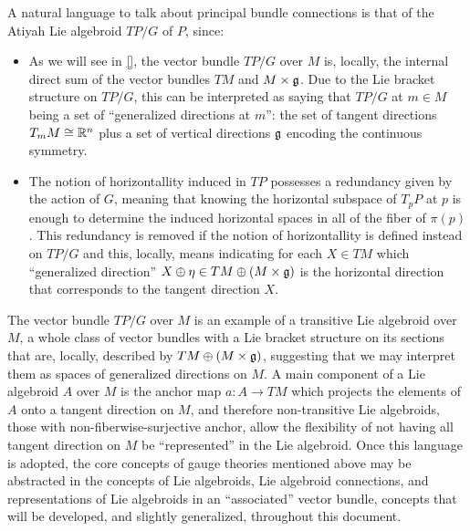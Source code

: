 A natural language to talk about principal bundle connections is that of the Atiyah Lie algebroid $TP/G$ of $P$, since:
    \begin{itemize}

    
    \item As we will see in \ref{}, the vector bundle $TP/G$ over $M$ is, locally, the internal direct sum of the vector bundles $TM$ and $M\times \mathfrak{g}$. Due to the Lie bracket structure on $TP/G$, this can be interpreted as saying that $TP/G$ at $m \in M$ being a set of ``generalized directions at $m$'': the set of tangent directions $T_m M \cong \mathbb{R}^n$ plus a set of vertical directions $\mathfrak{g}$ encoding the continuous symmetry.
    
    \item The notion of horizontallity induced in $TP$  %
    possesses a redundancy given by the action of $G$, meaning that knowing the horizontal subspace of $T_p P$ at $p$ is enough to determine the induced horizontal spaces in all of the fiber of $\pi(p)$. This redundancy is removed if the notion of horizontallity is defined instead on $TP/G$ and this, locally, means indicating for each $X \in TM$ which ``generalized direction'' $X \oplus \eta \in TM \oplus (M \times \mathfrak{g})$ is the horizontal direction that corresponds to the tangent direction $X$.
        
    \end{itemize}
The vector bundle $TP/G$ over $M$ is an example of a transitive Lie algebroid over $M$, a whole class of vector bundles with a Lie bracket structure on its sections that are, locally, described by $TM \oplus (M \times \mathfrak{g})$, suggesting that we may interpret them as spaces of generalized directions on $M$. 
A main component of a Lie algebroid $A$ over $M$ is the anchor map $a : A \to TM$ which projects the elements of $A$ onto a tangent direction on $M$, and therefore non-transitive Lie algebroids, those with non-fiberwise-surjective anchor, allow the flexibility of not having all tangent direction on $M$ be ``represented'' in the Lie algebroid. Once this language is adopted, the core concepts of gauge theories mentioned above may be abstracted in the concepts of Lie algebroids, Lie algebroid connections, and representations of Lie algebroids in an ``associated'' vector bundle, concepts that will be developed, and slightly generalized, throughout this document.

